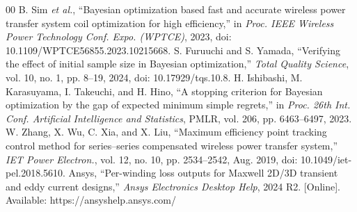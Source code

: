 \documentclass[conference]{IEEEtran}
\begin{document}
\begin{thebibliography}{00}
 B. Sim \emph{et al.}, ``Bayesian optimization based fast and accurate wireless power transfer system coil optimization for high efficiency,'' in \emph{Proc. IEEE Wireless Power Technology Conf. Expo. (WPTCE)}, 2023, doi: 10.1109/WPTCE56855.2023.10215668.
 S. Furuuchi and S. Yamada, ``Verifying the effect of initial sample size in Bayesian optimization,'' \emph{Total Quality Science}, vol. 10, no. 1, pp. 8--19, 2024, doi: 10.17929/tqs.10.8.
 H. Ishibashi, M. Karasuyama, I. Takeuchi, and H. Hino, ``A stopping criterion for Bayesian optimization by the gap of expected minimum simple regrets,'' in \emph{Proc. 26th Int. Conf. Artificial Intelligence and Statistics}, PMLR, vol. 206, pp. 6463--6497, 2023.
 W. Zhang, X. Wu, C. Xia, and X. Liu, ``Maximum efficiency point tracking control method for series--series compensated wireless power transfer system,'' \emph{IET Power Electron.}, vol. 12, no. 10, pp. 2534--2542, Aug. 2019, doi: 10.1049/iet-pel.2018.5610.
 Ansys, ``Per-winding loss outputs for Maxwell 2D/3D transient and eddy current designs,'' \emph{Ansys Electronics Desktop Help}, 2024 R2. [Online]. Available: https://ansyshelp.ansys.com/
\end{thebibliography}
\end{document}
